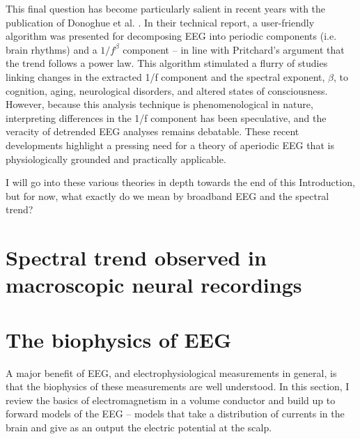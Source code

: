 This final question has become particularly salient in recent years with the publication of Donoghue et al. \cite{Donoghue2020}. In their technical report, a user-friendly algorithm was presented for decomposing EEG into periodic components (i.e. brain rhythms) and a $1/f^\beta$ component -- in line with Pritchard's argument that the trend follows a power law. This algorithm stimulated a flurry of studies linking changes in the extracted 1/f component and the spectral exponent, $\beta$, to cognition, aging, neurological disorders, and altered states of consciousness. However, because this analysis technique is phenomenological in nature, interpreting differences in the 1/f component has been speculative, and the veracity of detrended EEG analyses remains debatable. These recent developments highlight a pressing need for a theory of aperiodic EEG that is physiologically grounded and practically applicable.

I will go into these various theories in depth towards the end of this Introduction, but for now, what exactly do we mean by broadband EEG and the spectral trend?

\newpage

\section{Spectral trend observed in macroscopic neural recordings} \label{sec:phenomenon}

\section{The biophysics of EEG} \label{sec:EM_theory}

A major benefit of EEG, and electrophysiological measurements in general, is that the biophysics of these measurements are well understood. In this section, I review the basics of electromagnetism in a volume conductor and build up to forward models of the EEG -- models that take a distribution of currents in the brain and give as an output the electric potential at the scalp.

